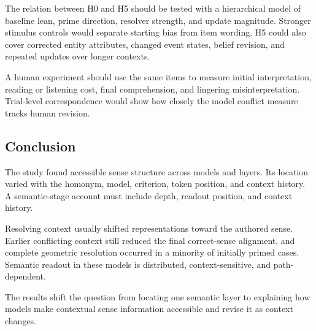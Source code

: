 \documentclass[conference]{IEEEtran}
\begin{document}
The relation between H0 and H5 should be tested with a hierarchical model of
baseline lean, prime direction, resolver strength, and update magnitude.
Stronger stimulus controls would separate starting bias from item wording. H5
could also cover corrected entity attributes, changed event states, belief
revision, and repeated updates over longer contexts.

A human experiment should use the same items to measure initial
interpretation, reading or listening cost, final comprehension, and lingering
misinterpretation. Trial-level correspondence would show how closely the model
conflict measure tracks human revision.

\subsection{Conclusion}
\label{sec:discussion-conclusion}

The study found accessible sense structure across models and layers. Its
location varied with the homonym, model, criterion, token position, and context
history. A semantic-stage account must include depth, readout position, and
context history.

Resolving context usually shifted representations toward the authored sense.
Earlier conflicting context still reduced the final correct-sense alignment,
and complete geometric resolution occurred in a minority of initially primed
cases. Semantic readout in these models is distributed, context-sensitive, and
path-dependent.

The results shift the question from locating one semantic layer to explaining
how models make contextual sense information accessible and revise it as
context changes.



\end{document}
